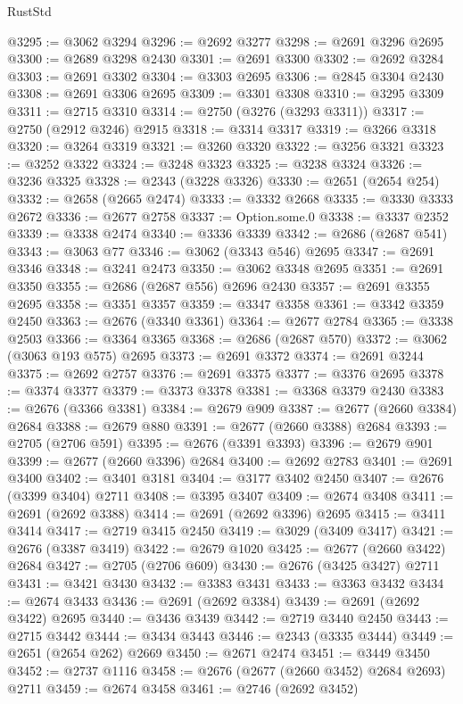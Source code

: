 \begin{lexlean}{RustStd}
\begin{coremodule}
@3295 := @3062 @3294
@3296 := @2692 @3277
@3298 := @2691 @3296 @2695
@3300 := @2689 @3298 @2430
@3301 := @2691 @3300
@3302 := @2692 @3284
@3303 := @2691 @3302
@3304 := @3303 @2695
@3306 := @2845 @3304 @2430
@3308 := @2691 @3306 @2695
@3309 := @3301 @3308
@3310 := @3295 @3309
@3311 := @2715 @3310
@3314 := @2750 (@3276 (@3293 @3311))
@3317 := @2750 (@2912 @3246) @2915
@3318 := @3314 @3317
@3319 := @3266 @3318
@3320 := @3264 @3319
@3321 := @3260 @3320
@3322 := @3256 @3321
@3323 := @3252 @3322
@3324 := @3248 @3323
@3325 := @3238 @3324
@3326 := @3236 @3325
@3328 := @2343 (@3228 @3326)
@3330 := @2651 (@2654 @254)
@3332 := @2658 (@2665 @2474)
@3333 := @3332 @2668
@3335 := @3330 @3333 @2672
@3336 := @2677 @2758
@3337 := Option.some.{0}
@3338 := @3337 @2352
@3339 := @3338 @2474
@3340 := @3336 @3339
@3342 := @2686 (@2687 @541)
@3343 := @3063 @77
@3346 := @3062 (@3343 @546) @2695
@3347 := @2691 @3346
@3348 := @3241 @2473
@3350 := @3062 @3348 @2695
@3351 := @2691 @3350
@3355 := @2686 (@2687 @556) @2696 @2430
@3357 := @2691 @3355 @2695
@3358 := @3351 @3357
@3359 := @3347 @3358
@3361 := @3342 @3359 @2450
@3363 := @2676 (@3340 @3361)
@3364 := @2677 @2784
@3365 := @3338 @2503
@3366 := @3364 @3365
@3368 := @2686 (@2687 @570)
@3372 := @3062 (@3063 @193 @575) @2695
@3373 := @2691 @3372
@3374 := @2691 @3244
@3375 := @2692 @2757
@3376 := @2691 @3375
@3377 := @3376 @2695
@3378 := @3374 @3377
@3379 := @3373 @3378
@3381 := @3368 @3379 @2430
@3383 := @2676 (@3366 @3381)
@3384 := @2679 @909
@3387 := @2677 (@2660 @3384) @2684
@3388 := @2679 @880
@3391 := @2677 (@2660 @3388) @2684
@3393 := @2705 (@2706 @591)
@3395 := @2676 (@3391 @3393)
@3396 := @2679 @901
@3399 := @2677 (@2660 @3396) @2684
@3400 := @2692 @2783
@3401 := @2691 @3400
@3402 := @3401 @3181
@3404 := @3177 @3402 @2450
@3407 := @2676 (@3399 @3404) @2711
@3408 := @3395 @3407
@3409 := @2674 @3408
@3411 := @2691 (@2692 @3388)
@3414 := @2691 (@2692 @3396) @2695
@3415 := @3411 @3414
@3417 := @2719 @3415 @2450
@3419 := @3029 (@3409 @3417)
@3421 := @2676 (@3387 @3419)
@3422 := @2679 @1020
@3425 := @2677 (@2660 @3422) @2684
@3427 := @2705 (@2706 @609)
@3430 := @2676 (@3425 @3427) @2711
@3431 := @3421 @3430
@3432 := @3383 @3431
@3433 := @3363 @3432
@3434 := @2674 @3433
@3436 := @2691 (@2692 @3384)
@3439 := @2691 (@2692 @3422) @2695
@3440 := @3436 @3439
@3442 := @2719 @3440 @2450
@3443 := @2715 @3442
@3444 := @3434 @3443
@3446 := @2343 (@3335 @3444)
@3449 := @2651 (@2654 @262) @2669
@3450 := @2671 @2474
@3451 := @3449 @3450
@3452 := @2737 @1116
@3458 := @2676 (@2677 (@2660 @3452) @2684 @2693) @2711
@3459 := @2674 @3458
@3461 := @2746 (@2692 @3452)

\end{coremodule}
\end{lexlean}
